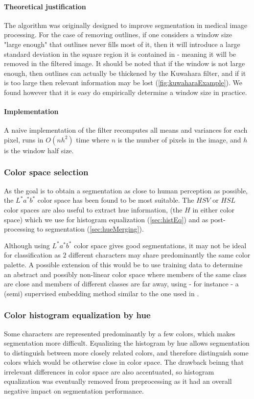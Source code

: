 \paragraph{Theoretical justification} The algorithm was originally designed to improve segmentation in medical image processing. For the case of removing outlines, if one considers a window size "large enough" that outlines never fills most of it, then it will introduce a large standard deviation in the square region it is contained in - meaning it will be removed in the filtered image. It should be noted that if the window is not large enough, then outlines can actually be thickened by the Kuwahara filter, and if it is too large then relevant information may be lost (\autoref{fig:kuwaharaExample}). We found however that it is easy do empirically determine a window size in practice.

\paragraph{Implementation} A naive implementation of the filter recomputes all means and variances for each pixel, runs in $O(nh^2)$ time where $n$ is the number of pixels in the image, and $h$ is the window half size.

\subsubsection{Color space selection}

As the goal is to obtain a segmentation as close to human perception as possible, the $L^*a^*b^*$ color space has been found to be most suitable. The $HSV$ or $HSL$ color spaces are also useful to extract hue information, (the $H$ in either color space) which we use for histogram equalization (\autoref{sec:histEq}) and as post-processing to segmentation (\autoref{sec:hueMerging}).

Although using $L^*a^*b^*$ color space gives good segmentations, it may not be ideal for classification as $2$ different characters may share predominantly the same color palette. A possible extension of this would be to use training data to determine an abstract and possibly non-linear color space where members of the same class are close and members of different classes are far away, using - for instance - a (semi) supervised embedding method similar to the one used in \cite{urahama2007semi}.

\subsubsection{Color histogram equalization by hue}
\label{sec:histEq}

Some characters are represented predominantly by a few colors, which makes segmentation more difficult. Equalizing the histogram by hue allows segmentation to distinguish between more closely related colors, and therefore distinguish some colors which would be otherwise close in color space. The drawback beinng that irrelevant differences in color space are also accentuated, so histogram equalization was eventually removed from preprocessing as it had an overall negative impact on segmentation performance.